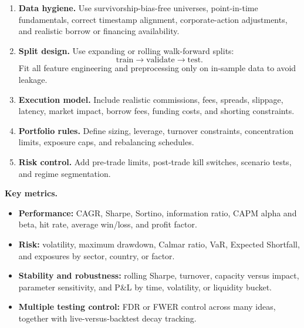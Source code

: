 \documentclass[11pt,letterpaper,openany]{book}
\begin{document}
\begin{enumerate}
\item \textbf{Data hygiene.} Use survivorship-bias-free universes, point-in-time fundamentals, correct timestamp alignment, corporate-action adjustments, and realistic borrow or financing availability.

\item \textbf{Split design.} Use expanding or rolling walk-forward splits:
\[
\text{train} \rightarrow \text{validate} \rightarrow \text{test}.
\]
Fit all feature engineering and preprocessing only on in-sample data to avoid leakage.

\item \textbf{Execution model.} Include realistic commissions, fees, spreads, slippage, latency, market impact, borrow fees, funding costs, and shorting constraints.

\item \textbf{Portfolio rules.} Define sizing, leverage, turnover constraints, concentration limits, exposure caps, and rebalancing schedules.

\item \textbf{Risk control.} Add pre-trade limits, post-trade kill switches, scenario tests, and regime segmentation.
\end{enumerate}

\textbf{Key metrics.}

\begin{itemize}
\item \textbf{Performance:} CAGR, Sharpe, Sortino, information ratio, CAPM alpha and beta, hit rate, average win/loss, and profit factor.
\item \textbf{Risk:} volatility, maximum drawdown, Calmar ratio, VaR, Expected Shortfall, and exposures by sector, country, or factor.
\item \textbf{Stability and robustness:} rolling Sharpe, turnover, capacity versus impact, parameter sensitivity, and P\&L by time, volatility, or liquidity bucket.
\item \textbf{Multiple testing control:} FDR or FWER control across many ideas, together with live-versus-backtest decay tracking.
\end{itemize}
\end{document}
